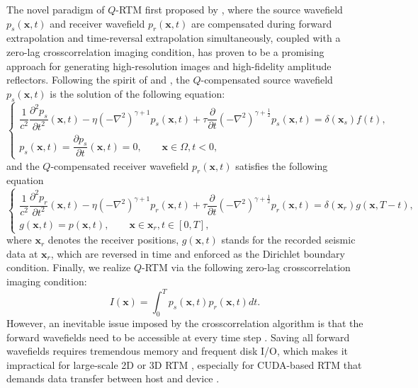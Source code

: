 The novel paradigm of $Q$-RTM first proposed by \cite{Zhu2014Q}, where the source wavefield $p_s(\mathbf{x},t)$ and receiver wavefield $p_r(\mathbf{x},t)$ are compensated during forward extrapolation and time-reversal extrapolation simultaneously, coupled with a zero-lag crosscorrelation imaging condition, has proven to be a promising approach for generating high-resolution images and high-fidelity amplitude reflectors. Following the spirit of \cite{Treeby2010Photoacoustic} and \cite{Zhu2014Q}, the $Q$-compensated source wavefield $p_s(\mathbf{x},t)$ is the solution of the following equation:
\begin{equation}  
\left\{  
             \begin{array}{lr}  
             \dfrac{1}{c^2}\dfrac{\partial^2p_s}{\partial t^2}(\mathbf{x},t)-\eta(-\nabla^2)^{\gamma+1}p_s(\mathbf{x},t)+\tau \dfrac{\partial}{\partial t}					
             (-\nabla^2)^{\gamma+\frac{1}{2}}p_s(\mathbf{x},t) = \delta(\mathbf{x}_s)f(t),  &  \\  
             p_s(\mathbf{x},t)=\dfrac{\partial p_s}{\partial t}(\mathbf{x},t)=0,   \qquad \mathbf{x} \in \Omega, t<0, & 
             \end{array}  
\right.  
\label{eq:Qpforward}
\end{equation} 
and the $Q$-compensated receiver wavefield $p_r(\mathbf{x},t)$ satisfies the following equation
\begin{equation}
\left\{  
            \begin{array}{lr}
			\dfrac{1}{c^2}\dfrac{\partial^2p_r}{\partial t^2}(\mathbf{x},t)-\eta(-\nabla^2)^{\gamma+1}p_r(\mathbf{x},t)+\tau \dfrac{\partial}{\partial t}		
			(-\nabla^2)^{\gamma+\frac{1}{2}}p_r(\mathbf{x},t) = \delta(\mathbf{x}_r)g(\mathbf{x},T-t), &  \\ 
			g(\mathbf{x},t)=p(\mathbf{x},t), \qquad \mathbf{x} \in \mathbf{x}_r, t \in [0,T], & 
            \end{array}  
\right.  
\label{eq:Qpbackward}
\end{equation} 
where $\mathbf{x}_r$ denotes the receiver positions, $g(\mathbf{x},t)$ stands for the recorded seismic data at $\mathbf{x}_r$, which are reversed in time and enforced as the Dirichlet boundary condition. Finally, we realize $Q$-RTM via the following zero-lag crosscorrelation imaging condition:
\begin{equation}
I(\mathbf{x})= \int_0^T p_s(\mathbf{x},t) p_r(\mathbf{x},t) dt.
\label{eq:ic}
\end{equation}
However, an inevitable issue imposed by the crosscorrelation algorithm is that the forward wavefields need to be accessible at every time step \citep{Anderson2012Time, yang2016wavefield}. Saving all forward wavefields requires tremendous memory and frequent disk I/O, which makes it impractical for large-scale 2D or 3D RTM \citep{Symes2007Reverse, Tan2014Reducing}, especially for CUDA-based RTM that demands data transfer between host and device \citep{Yang2014RTM}. 



